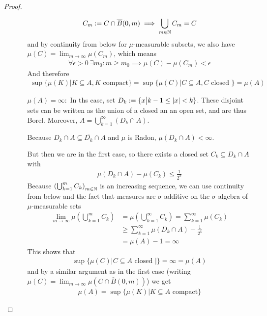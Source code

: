 \begin{proof}
\begin{enumerate}
\begin{enumerate}
        \begin{align*}
          C_m := C \cap \overline{B}(0,m) \implies \bigcup_{m \in \mathbb{N}} C_m = C
        \end{align*}
        and by continuity from below for $\mu$-measurable subsets, we also have $\mu(C) = \lim_{m \to \infty} \mu(C_m)$, which means
        \begin{align*}
          \forall  \epsilon > 0\ \exists m_0: m \geq m_0 \implies \mu(C) - \mu(C_m) < \epsilon
        \end{align*}
        And therefore 
        \begin{align*}
          \sup \{\mu(K) \big\vert K \subseteq A, K \text{ compact}\}
          =
          \sup \{\mu(C) \big\vert C \subseteq A, C \text{ closed } \}
          = \mu(A)
        \end{align*}


      \item[$\mu(A) = \infty:$] In ths case, set $D_k := \{x \big\vert k-1 \leq \vert x\vert < k\}$. These disjoint sets can be written as the union of a closed an an open set, and are thus Borel.
        Moreover,
        $A = \bigcup_{k=1}^{\infty}(D_k \cap A)$.

        Because $D_k \cap A \subseteq \overline{D_k} \cap A$ and $\mu$ is Radon, $\mu(D_k \cap A) < \infty$.

        But then we are in the first case, so there exists a closed set $C_k \subseteq D_k \cap A$ with
        \begin{align*}
          \mu(D_k \cap A) - \mu(C_k) \leq \frac{1}{2^{k}}
        \end{align*}
        Because $\left(
          \bigcup_{k=1}^{m}C_k
        \right)_{m \in \mathbb{N}}$ is an increasing sequence, we can use continuity from below and the fact that measures are $\sigma$-additive on the $\sigma$-algebra of $\mu$-measurable sets
        \begin{align*}
          \lim_{m \to \infty} \mu \left(
            \bigcup_{k=1}^{m}C_k
          \right) 
          &=
          \mu \left(
            \bigcup_{k=1}^{\infty}C_k
          \right)
          = \sum_{k=1}^{\infty} \mu(C_k)
          \\
          &\geq \sum_{k=1}^{\infty} \mu(D_k \cap A) - \frac{1}{2^{k}}\\
          &= \mu(A) - 1 = \infty
        \end{align*}
        This shows that
        \begin{align*}
          \sup \{\mu(C) \big\vert C \subseteq A \text{ closed }\big\vert\} = \infty = \mu(A)
        \end{align*}
        and by a similar argument as in the first case (writing $\mu(C) = \lim_{m \to \infty} \mu(C \cap \overline{B}(0,m))$) we get
        \begin{align*}
          \mu(A) = \sup\{\mu(K) \big\vert K \subseteq A \text{ compact}\}
        \end{align*}
    \end{enumerate}
\end{enumerate}
\end{proof}


